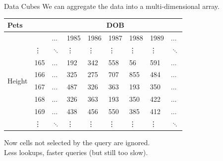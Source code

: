 \documentclass{beamer}
\theoremstyle{definition}
\theoremstyle{definition}
\begin{document}
\begin{frame}{Data Cubes}
    We can aggregate the data into a multi-dimensional array.\cite{Gray96}

    \begin{table}[h]\footnotesize
        \begin{tabular} { | l | l | l | l | l | l | l | l | l |}
        \hline
        \textbf{Pets} & & \multicolumn{7}{|c|}{DOB} \\ \hline
        & & $\hdots$ & 1985 & 1986 & 1987 & 1988 & 1989 & $\hdots$ \\ \hline
        \multirow{6}{*}{Height}
        & \vdots & $\ddots$ & \vdots & \vdots & \vdots & \vdots & \vdots & $\ddots$ \\
        & 165 & $\hdots$ & 192 & 342 & 558 & 56 & 591 & $\hdots$ \\
        & 166 & $\hdots$ & 325 & 275 & 707 & 855 & 484 & $\hdots$ \\
        & 167 & $\hdots$ & 487 & 326 & 363 & 193 & 350 & $\hdots$ \\
        & 168 & $\hdots$ & 326 & 363 & 193 & 350 & 422 & $\hdots$ \\
        & 169 & $\hdots$ & 438 & 456 & 550 & 385 & 412 & $\hdots$ \\
        & \vdots & $\ddots$ & \vdots & \vdots & \vdots & \vdots & \vdots & $\ddots$ \\
        \hline
        \end{tabular}
    \end{table}
    \pause
    Now cells not selected by the query are ignored. \\
    Less lookups, faster queries (but still too slow).
\end{frame}
\end{document}
